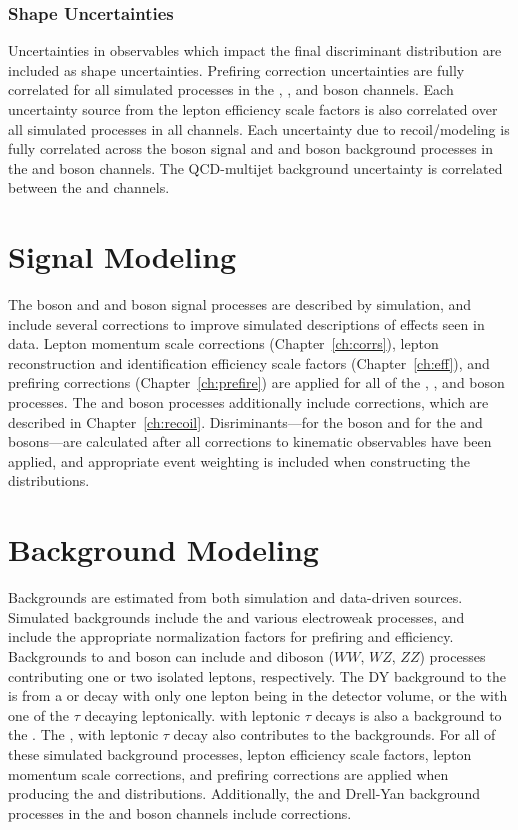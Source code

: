 \subsubsection{Shape Uncertainties}
Uncertainties in observables which impact the final discriminant distribution are included as shape uncertainties. Prefiring correction uncertainties are fully correlated for all simulated processes in the \Wp, \Wm, and \Z boson channels. Each uncertainty source from the lepton efficiency scale factors is also correlated over all simulated processes in all channels. Each uncertainty due to recoil/\met modeling is fully correlated across the \W boson signal and \W and \Z boson background processes in the \Wp and \Wm boson channels. The QCD-multijet background uncertainty is correlated between the \Wp and \Wm channels.

\section{Signal Modeling}\label{ch:sig:sig}
The \Z boson and \Wp and \Wm boson signal processes are described by simulation, and include several corrections to improve simulated descriptions of effects seen in data. Lepton momentum scale corrections (Chapter~\ref{ch:corrs}), lepton reconstruction and identification efficiency scale factors (Chapter~\ref{ch:eff}), and prefiring corrections (Chapter~\ref{ch:prefire}) are applied for all of the \Wp, \Wm, and \Z boson processes. The \Wp and \Wm boson processes additionally include \met corrections, which are described in Chapter~\ref{ch:recoil}. Disriminants---\mll for the \Z boson and \mt for the \Wp and \Wm bosons---are calculated after all corrections to kinematic observables have been applied, and appropriate event weighting is included when constructing the distributions. 

\section{Background Modeling}\label{ch:sig:bkg}
Backgrounds are estimated from both simulation and data-driven sources. Simulated backgrounds include the \ttbar and various electroweak processes, and include the appropriate normalization factors for prefiring and efficiency. Backgrounds to \W and \Z boson can include \ttbar and diboson ($WW$, $WZ$, $ZZ$) processes contributing one or two isolated leptons, respectively. The DY background to the \W is from a \zmm or \zee decay with only one lepton being in the detector volume, or the \ztt with one of the $\tau$ decaying leptonically. \ztt with leptonic $\tau$ decays is also a background to the \Z. The \wtau, with leptonic $\tau$ decay also contributes to the \W backgrounds.
For all of these simulated background processes, lepton efficiency scale factors, lepton momentum scale corrections, and prefiring corrections are applied when producing the \mt and \mll distributions. Additionally, the \wtau and Drell-Yan background processes in the \Wp and \Wm boson channels include \met corrections.


